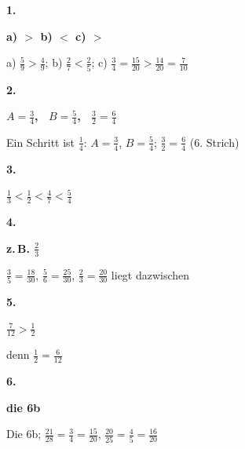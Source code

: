 \documentclass[11pt]{article}
\newcommand{\lsg}[3]{\par\noindent\begin{minipage}[t]{9mm}\textbf{#1}\end{minipage}%
  \begin{minipage}[t]{52mm}\raggedright\bfseries\boldmath #2\end{minipage}\hspace{3mm}%
  \begin{minipage}[t]{\dimexpr\linewidth-64mm\relax}\raggedright\small #3\end{minipage}\par\vspace{4pt}}
\begin{document}
\lsg{1.}{a) $>$ \quad b) $<$ \quad c) $>$}{a) $\frac{5}{9} > \frac{4}{9}$; b) $\frac{2}{7} < \frac{2}{5}$; c) $\frac{3}{4} = \frac{15}{20} > \frac{14}{20} = \frac{7}{10}$}
\lsg{2.}{$A = \frac{3}{4}$, \ $B = \frac{5}{4}$, \ $\frac{3}{2} = \frac{6}{4}$}{Ein Schritt ist $\frac{1}{4}$: $A = \frac{3}{4}$, $B = \frac{5}{4}$; $\frac{3}{2} = \frac{6}{4}$ (6. Strich)}
\lsg{3.}{$\frac{1}{3} < \frac{1}{2} < \frac{4}{7} < \frac{5}{4}$}{}
\lsg{4.}{z.\,B. $\frac{2}{3}$}{$\frac{3}{5} = \frac{18}{30}$, $\frac{5}{6} = \frac{25}{30}$, $\frac{2}{3} = \frac{20}{30}$ liegt dazwischen}
\lsg{5.}{$\frac{7}{12} > \frac{1}{2}$}{denn $\frac{1}{2} = \frac{6}{12}$}
\lsg{6.}{die 6b}{Die 6b; $\frac{21}{28} = \frac{3}{4} = \frac{15}{20}$, $\frac{20}{25} = \frac{4}{5} = \frac{16}{20}$}
\end{document}
